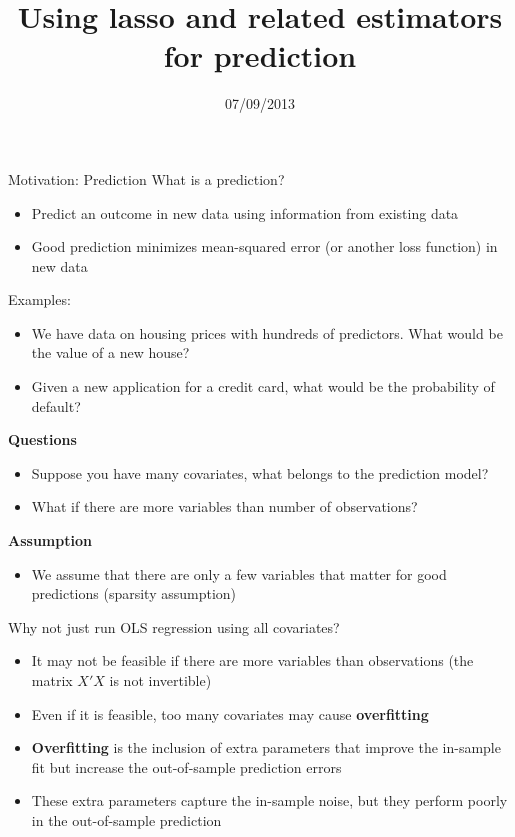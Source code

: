 \documentclass{beamer}
\title{Using lasso and related estimators for prediction}
\date{07/09/2013}
\begin{document}
	\begin{frame}
		\titlepage
	\end{frame}

\begin{frame}{Motivation: Prediction}
	What is a prediction?
	\begin{itemize}
		\item Predict an outcome in new data using information from existing data
		\item Good prediction minimizes mean-squared error (or another loss function) in new data
	\end{itemize}
	Examples:
	\begin{itemize}
		\item We have data on housing prices with hundreds of predictors. What would be the value of a new house?
		\item Given a new application for a credit card, what would be the probability of default?
	\end{itemize}
\end{frame}

\begin{frame}
	\textbf{Questions}
	\begin{itemize}
		\item Suppose you have many covariates, {\color{red}what belongs to the prediction model?}
		\item What if there are {\color{red}more variables than number of observations?}
	\end{itemize}
	\textbf{Assumption}
	\begin{itemize}
		\item We assume that there are only a few variables that matter for good predictions (sparsity assumption)
	\end{itemize}
\end{frame}	

\begin{frame}{Why not just run OLS regression using all covariates?}
	\begin{itemize}
		\item It may not be feasible if there are more variables than observations (the matrix $\mathit{X′X}$ is not invertible)
		\item Even if it is feasible, too many covariates may cause \textbf{overfitting}
		\item \textbf{Overfitting} is the inclusion of extra parameters that {\color{red}improve the in-sample fit but increase the out-of-sample prediction errors}
		\item These extra parameters capture the in-sample noise, but they perform poorly in the out-of-sample prediction
	\end{itemize}
\end{frame}	
\end{document}
